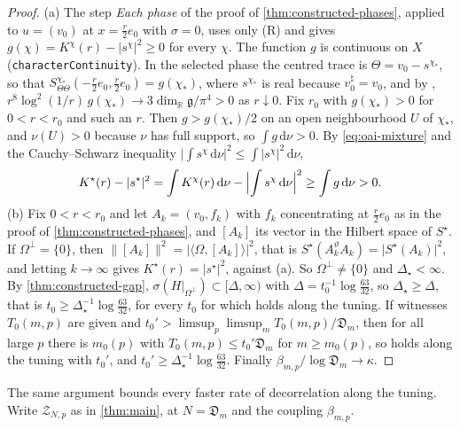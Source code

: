 \documentclass[11pt,a4paper]{amsart}
\theoremstyle{definition}
\theoremstyle{remark}
\numberwithin{equation}{section}
\newcommand{\R}{\mathbb{R}}          %
\newcommand{\ip}[2]{\langle #1,#2\rangle}  %
\newcommand{\norm}[1]{\lVert #1\rVert}     %
\newcommand{\abs}[1]{\lvert #1\rvert}      %
\newcommand{\dd}{\,\mathrm{d}}             %
\newcommand{\TT}{\mathbb{T}}               %
\newcommand{\Zc}{\mathcal{Z}}              %
\newcommand{\Mcirc}{\text{\upshape(M$^{\circ}$)}}   %
\newcommand{\tzero}{t_0}                   %
\newcommand{\Den}{\mathfrak D}            %
\begin{document}
\begin{proof}
(a) The step \emph{Each phase} of the proof of \cref{thm:constructed-phases}, applied to $u=(v_0)$ at $x=\frac r2e_0$ with $\sigma=0$, uses only (R) and gives $g(\chi)=K^\chi(r)-\abs{s^\chi}^2\ge0$ for every $\chi$. The function $g$ is continuous on $X$ (\texttt{characterContinuity}). In the selected phase the centred trace is $\Theta=v_0-s^{\chi_*}$, so that $S^{\chi_*}_{\Theta\Theta}(-\frac r2e_0,\frac r2e_0)=g(\chi_*)$, where $s^{\chi_*}$ is real because $v_0^\natural=v_0$, and by \cite[Theorem~7.1]{ymgroup2026}, $r^8\log^2(1/r)\,g(\chi_*)\to3\dim_\R\mathfrak g/\pi^4>0$ as $r\downarrow0$. Fix $r_0$ with $g(\chi_*)>0$ for $0<r<r_0$ and such an $r$. Then $g>g(\chi_*)/2$ on an open neighbourhood $U$ of $\chi_*$, and $\nu(U)>0$ because $\nu$ has full support, so $\int g\dd\nu>0$. By \eqref{eq:oai-mixture} and the Cauchy--Schwarz inequality $\abs{\int s^\chi\dd\nu}^2\le\int\abs{s^\chi}^2\dd\nu$,
\[
K^\star(r)-\abs{s^\star}^2=\int K^\chi(r)\dd\nu-\Bigl|\int s^\chi\dd\nu\Bigr|^2\ge\int g\dd\nu>0 .
\]
(b) Fix $0<r<r_0$ and let $A_k=(v_0,f_k)$ with $f_k$ concentrating at $\frac r2e_0$ as in the proof of \cref{thm:constructed-phases}, and $[A_k]$ its vector in the Hilbert space of $S^\star$. If $\Omega^\perp=\{0\}$, then $\norm{[A_k]}^2=\abs{\ip{\Omega}{[A_k]}}^2$, that is $S^\star(A_k^\vartheta A_k)=\abs{S^\star(A_k)}^2$, and letting $k\to\infty$ gives $K^\star(r)=\abs{s^\star}^2$, against (a). So $\Omega^\perp\ne\{0\}$ and $\Delta_\star<\infty$. By \cref{thm:constructed-gap}, $\sigma(H|_{\Omega^\perp})\subset[\Delta,\infty)$ with $\Delta=\tzero^{-1}\log\frac{63}{32}$, so $\Delta_\star\ge\Delta$, that is $\tzero\ge\Delta_\star^{-1}\log\frac{63}{32}$, for every $\tzero$ for which \Mcirc{} holds along the tuning. If witnesses $T_0(m,p)$ are given and $\tzero'>\limsup_p\limsup_mT_0(m,p)/\Den_m$, then for all large $p$ there is $m_0(p)$ with $T_0(m,p)\le\tzero'\Den_m$ for $m\ge m_0(p)$, so \Mcirc{} holds along the tuning with $\tzero'$, and $\tzero'\ge\Delta_\star^{-1}\log\frac{63}{32}$. Finally $\beta_{m,p}/\log \Den_m\to\kappa$.
\end{proof}

The same argument bounds every faster rate of decorrelation along the tuning. Write $\Zc_{N,p}$ as in \cref{thm:main}, at $N=\Den_m$ and the coupling $\beta_{m,p}$.
\end{document}
